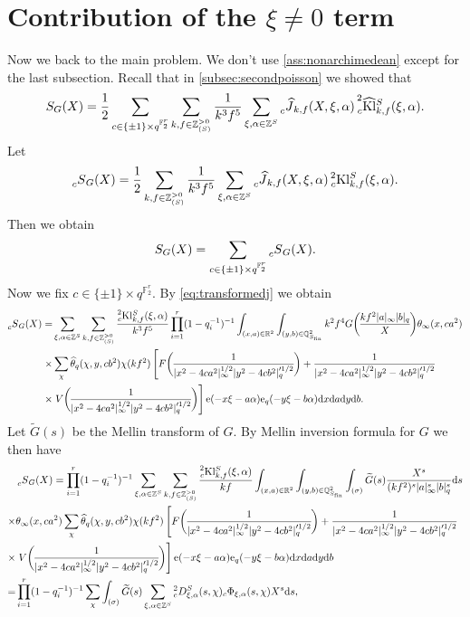 \documentclass[10pt,oneside,reqno]{amsart}
\newcommand\rmd{\mathrm{d}}
\newcommand\rme{\mathrm{e}}
\newcommand\FF{\mathbb{F}}
\newcommand\QQ{\mathbb{Q}}
\newcommand\RR{\mathbb{R}}
\newcommand\ZZ{\mathbb{Z}}
\newcommand\fin{\mathrm{fin}}
\newcommand\Kl{\mathrm{Kl}}
\newcommand\legendresymbol[2]{\genfrac{(}{)}{}{}{#1}{#2}}
\theoremstyle{THEOREM}
\theoremstyle{DEFINITION}
\theoremstyle{EXERCISE}
\numberwithin{equation}{section}
\begin{document}
\section{Contribution of the $\xi\neq 0$ term}\label{sec:mainanalysis}
Now we back to the main problem. We don't use \autoref{ass:nonarchimedean} except for the last subsection. Recall that in \autoref{subsec:secondpoisson} we showed that
\[
S_G(X)=\frac12\sum_{c\in \{\pm 1\}\times q^{\FF_2^r}}\sum_{k,f\in \ZZ_{(S)}^{>0}}\frac{1}{k^3f^5}\sum_{\xi,\alpha\in \ZZ^S}\prescript{}{c}{\widehat{J}}_{k,f}(X,\xi,\alpha)\prescript{2}{c}{\widehat{\Kl}}_{k,f}^S(\xi,\alpha).
\]
Let
\[
\prescript{}{c}S_G(X)=\frac12\sum_{k,f\in \ZZ_{(S)}^{>0}}\frac{1}{k^3f^5}\sum_{\xi,\alpha\in \ZZ^S}\prescript{}{c}{\widehat{J}}_{k,f}(X,\xi,\alpha)\prescript{2}{c}{\Kl}_{k,f}^S(\xi,\alpha).
\]
Then we obtain
\[
S_G(X)=\sum_{c\in \{\pm 1\}\times q^{\FF_2^r}}\prescript{}{c}S_G(X).
\]
Now we fix $c\in \{\pm 1\}\times q^{\FF_2^r}$.
By \eqref{eq:transformedj} we obtain
\begin{align*}
\prescript{}{c}S_G(X)=&\sum_{\xi,\alpha\in \ZZ^S}\sum_{k,f\in \ZZ_{(S)}^{>0}}\frac{\prescript{2}{c}{\Kl}_{k,f}^S(\xi,\alpha)}{k^3f^5}\prod_{i=1}^{r}(1-q_i^{-1})^{-1} \int_{(x,a)\in\RR^2}\int_{(y,b)\in\QQ_{S_\fin}^2} k^2f^4 G\legendresymbol{kf^2|a|_\infty|b|_q}{X} \theta_\infty(x,ca^2)\\
\times&\sum_{\chi}\widehat{\theta}_{q}(\chi,y,cb^2)\chi(kf^2)\left[F\legendresymbol {1}{|x^2-4ca^2|_\infty^{1/2}|y^2- 4cb^2|_q'^{1/2}}+\frac{1}{|x^2-4ca^2|_\infty^{1/2}|y^2- 4cb^2|_q'^{1/2}}\right.\\
\times&\left.V\legendresymbol{1}{|x^2-4ca^2|_\infty^{1/2}|y^2- 4cb^2|_q'^{1/2}}\right]\rme(-x\xi-a\alpha)\rme_{q}(-y\xi-b\alpha)\rmd x\rmd a\rmd y\rmd b.
\end{align*}
Let $\widetilde{G}(s)$ be the Mellin transform of $G$. By Mellin inversion formula for $G$ we then have
\begin{align*}
&\prescript{}{c}S_G(X)=\prod_{i=1}^{r}(1-q_i^{-1})^{-1} \sum_{\xi,\alpha\in \ZZ^S}\sum_{k,f\in \ZZ_{(S)}^{>0}}\frac{\prescript{2}{c}{\Kl}_{k,f}^S(\xi,\alpha)}{kf} \int_{(x,a)\in\RR^2}\int_{(y,b)\in\QQ_{S_\fin}^2} \int_{(\sigma)}\widetilde{G}(s)\frac{X^s}{(kf^2)^s|a|_\infty^s|b|_q^s}\rmd s \\
\times&\theta_\infty(x,ca^2)\sum_{\chi}\widehat{\theta}_{q}(\chi,y,cb^2)\chi(kf^2) \left[F\legendresymbol{1}{|x^2-4ca^2|_\infty^{1/2}|y^2- 4cb^2|_q'^{1/2}}+\frac{1}{|x^2-4ca^2|_\infty^{1/2}|y^2- 4cb^2|_q'^{1/2}}\right.\\
\times&\left.V\legendresymbol{1}{|x^2-4ca^2|_\infty^{1/2}|y^2- 4cb^2|_q'^{1/2}}\right]\rme(-x\xi-a\alpha)\rme_{q}(-y\xi-b\alpha)\rmd x\rmd a\rmd y\rmd b\\
=&\prod_{i=1}^{r}(1-q_i^{-1})^{-1}\sum_{\chi}\int_{(\sigma)}\widetilde{G}(s) \sum_{\xi,\alpha\in \ZZ^S}{}^2_c D_{\xi,\alpha}^S(s,\chi){}_c\Phi_{\xi,\alpha}(s,\chi)X^s\rmd s,
\end{align*}
\end{document}
